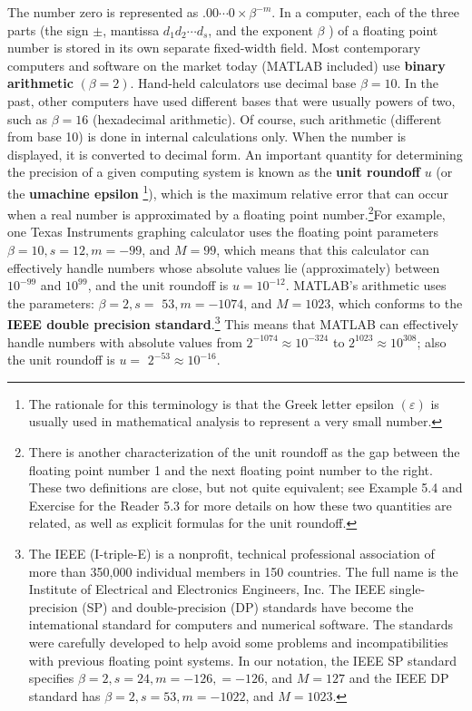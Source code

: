\documentclass[../main.tex]{subfiles}
\begin{document}
The number zero is represented as $.00 \cdots 0 \times \beta^{-m}$. In a computer, each of the three parts (the sign $\pm$, mantissa $d_{1} d_{2} \cdots d_{s}$, and the exponent $\beta$ ) of a floating point number is stored in its own separate fixed-width field. Most contemporary computers and software on the market today (MATLAB included) use \textbf{binary arithmetic} $(\beta=2)$. Hand-held calculators use decimal base $\beta=10$. In the past, other computers have used different bases that were usually powers of two, such as $\beta=16$ (hexadecimal arithmetic). Of course, such arithmetic (different from base 10) is done in internal calculations only. When the number is displayed, it is converted to decimal form. An important quantity for determining the precision of a given computing system is known as the \textbf{unit roundoff} $u$ (or the \textbf{umachine epsilon} \footnote{The rationale for this terminology is that the Greek letter epsilon $(\varepsilon)$ is usually used in mathematical analysis to represent a very small number.
}), which is the maximum relative error that can occur when a real number is approximated by a floating point number.\footnote{There is another characterization of the unit roundoff as the gap between the floating point number 1 and the next floating point number to the right. These two definitions are close, but not quite equivalent; see Example 5.4 and Exercise for the Reader 5.3 for more details on how these two quantities are related, as well as explicit formulas for the unit roundoff.}For example, one Texas Instruments graphing calculator uses the floating point parameters $\beta=10, s=12, m=-99$, and $M=99$, which means that this calculator can effectively handle numbers whose absolute values lie (approximately) between $10^{-99}$ and $10^{99}$, and the unit roundoff is $u=10^{-12}$. MATLAB's arithmetic uses the parameters: $\beta=2, s=$ $53, m=-1074$, and $M=1023$, which conforms to the \textbf{IEEE double precision standard}.\footnote{The IEEE (I-triple-E) is a nonprofit, technical professional association of more than 350,000 individual members in 150 countries. The full name is the Institute of Electrical and Electronics Engineers, Inc. The IEEE single-precision (SP) and double-precision (DP) standards have become the intemational standard for computers and numerical software. The standards were carefully developed to help avoid some problems and incompatibilities with previous floating point systems. In our notation, the IEEE SP standard specifies $\beta=2, s=24, m=-126,=-126$, and $M=127$ and the IEEE DP standard has $\beta=2, s=53, m=-1022$, and $M=1023$.} This means that MATLAB can effectively handle numbers with absolute values from $2^{-1074} \approx 10^{-324}$ to $2^{1023} \approx 10^{308}$; also the unit roundoff is $u=$ $2^{-53} \approx 10^{-16}$.
\end{document}

